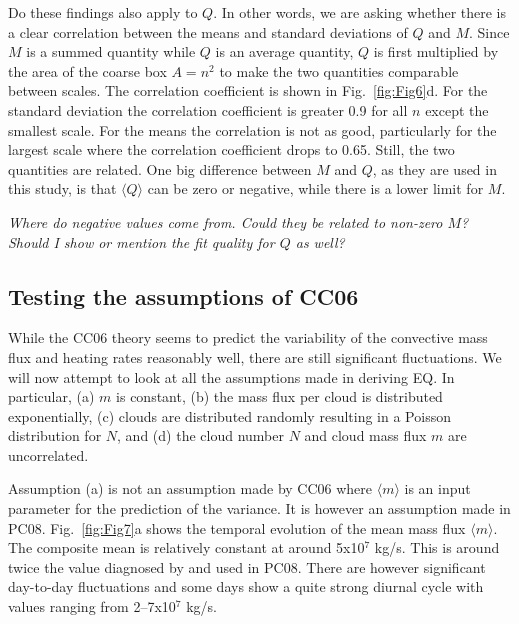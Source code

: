 \documentclass[a4paper, 12pt]{article}
\begin{document}
Do these findings also apply to $Q$. In other words, we are asking whether there is a clear correlation between the means and standard deviations of $Q$ and $M$. Since $M$ is a summed quantity while $Q$ is an average quantity, $Q$ is first multiplied by the area of the coarse box $A=n^2$ to make the two quantities comparable between scales. The correlation coefficient is shown in Fig.~\ref{fig:Fig6}d. For the standard deviation the correlation coefficient is greater 0.9 for all $n$ except the smallest scale. For the means the correlation is not as good, particularly for the largest scale where the correlation coefficient drops to 0.65. Still, the two quantities are related. One big difference between $M$ and $Q$, as they are used in this study, is that $\langle Q \rangle$ can be zero or negative, while there is a lower limit for $M$. 

\textit{Where do negative values come from. Could they be related to non-zero $M$? Should I show or mention the fit quality for $Q$ as well?}

\subsection{Testing the assumptions of CC06}
While the CC06 theory seems to predict the variability of the convective mass flux and heating rates reasonably well, there are still significant fluctuations. We will now attempt to look at all the assumptions made in deriving EQ. In particular, (a) $m$ is constant, (b) the mass flux per cloud is distributed exponentially, (c) clouds are distributed randomly resulting in a Poisson distribution for $N$, and (d) the cloud number $N$ and cloud mass flux $m$ are uncorrelated.

Assumption (a) is not an assumption made by CC06 where $\langle m \rangle$ is an input parameter for the prediction of the variance. It is however an assumption made in PC08. Fig.~\ref{fig:Fig7}a shows the temporal evolution of the mean mass flux $\langle m \rangle$. The composite mean is relatively constant at around 5x10$^7$ kg/s. This is around twice the value diagnosed by \cite{Cohen2006} and used in PC08. There are however significant day-to-day fluctuations and some days show a quite strong diurnal cycle with values ranging from 2--7x10$^7$ kg/s. 
\end{document}
